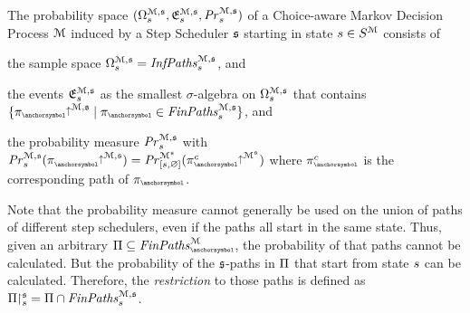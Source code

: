 \begin{definition}
\label{def:probspace_CMDP_stepscheduler}
The probability space $(\Omega_{s}^{\mathcal{M},\mathfrak{s}},\mathfrak{E}_{s}^{\mathcal{M},\mathfrak{s}},\mathit{Pr}_{s}^{\mathcal{M},\mathfrak{s}})$ of a Choice-aware Markov Decision Process $\mathcal{M}$ induced by a Step Scheduler $\mathfrak{s}$ starting in state $s\in S^{\mathcal{M}}$ consists of
\begin{compactitem}
\item the sample space $\Omega_{s}^{\mathcal{M},\mathfrak{s}} = \mathit{InfPaths}_{s}^{\mathcal{M},\mathfrak{s}}$, and 
\item the events $\mathfrak{E}_{s}^{\mathcal{M},\mathfrak{s}}$ as the smallest $\sigma$-algebra on $\Omega_{s}^{\mathcal{M},\mathfrak{s}}$ that contains $\{ \CmdpCylinder{\StepScheduler}{\ancfinpath}\mid \ancfinpath \in \CmdpAncFinStepSchedulerPathsStartingFrom{\state} \}$, and
\item the probability measure $\mathit{Pr}_{s}^{\mathcal{M},\mathfrak{s}}$ with $\CmdpProbInState{\StepScheduler}{\state}(\CmdpCylinder{\StepScheduler}{\ancfinpath^\correspondingOfCmdp})=\ProbOfInState{\Mc^\StepScheduler}{\anctuple{\state}{\emptysequence}}(\CylinderOf{\Mc^\StepScheduler}{\ancfinpath^c})$ where $\ancfinpath^c$ is the corresponding path of $\ancfinpath$.
\end{compactitem}
\end{definition}


Note that the probability measure cannot generally be used on the union of paths of different step schedulers, even if the paths all start in the same state.
Thus, given an arbitrary $\AncFinPathsOfInterest \subseteq \CmdpAncFinPaths$, the probability of that paths cannot be calculated.
But the probability of the $\mathfrak{s}$-paths in $\Pi$ that start from state $s$ can be calculated.
Therefore, the \emph{restriction} to those paths is defined as ${\Pi\mathop{\hspace{-0.2em}\upharpoonright^{\mathfrak{s}}_{s}}} = \Pi \cap \mathit{FinPaths}_{s}^{\mathcal{M},\mathfrak{s}}$.



